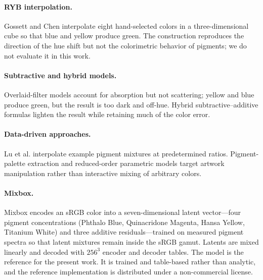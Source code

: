 \paragraph{RYB interpolation.}
Gossett and Chen \cite{gossett2004} interpolate eight hand-selected colors in a three-dimensional cube so that blue and yellow produce green. The construction reproduces the direction of the hue shift but not the colorimetric behavior of pigments; we do not evaluate it in this work.

\paragraph{Subtractive and hybrid models.}
Overlaid-filter models account for absorption but not scattering; yellow and blue produce green, but the result is too dark and off-hue. Hybrid subtractive--additive formulas \cite{simonot2014} lighten the result while retaining much of the color error.

\paragraph{Data-driven approaches.}
Lu et al. \cite{lu2014} interpolate example pigment mixtures at predetermined ratios. Pigment-palette extraction \cite{aharoni2017,tan2019} and reduced-order parametric models \cite{shugrina2020} target artwork manipulation rather than interactive mixing of arbitrary colors.

\paragraph{Mixbox.}
Mixbox \cite{sochorova2021} encodes an sRGB color into a seven-dimensional latent vector---four pigment concentrations (Phthalo Blue, Quinacridone Magenta, Hansa Yellow, Titanium White) and three additive residuals---trained on measured pigment spectra so that latent mixtures remain inside the sRGB gamut. Latents are mixed linearly and decoded with $256^{3}$ encoder and decoder tables. The model is the reference for the present work. It is trained and table-based rather than analytic, and the reference implementation is distributed under a non-commercial license.
